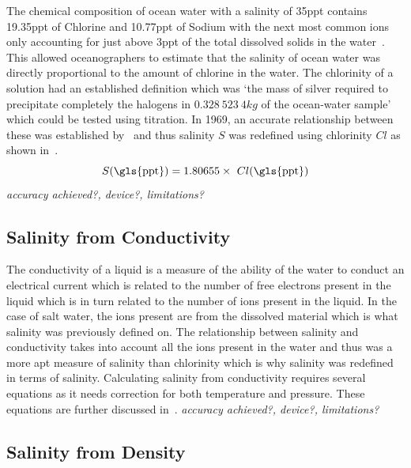 The chemical composition of ocean water with a salinity of 35\gls{ppt} contains 19.35\gls{ppt} of Chlorine and 10.77\gls{ppt} of Sodium with the next most common ions only accounting for just above 3\gls{ppt} of the total dissolved solids in the water~\cite{britannica_seawater_encyclopaedia_2024}.
This allowed oceanographers to estimate that the salinity of ocean water was directly proportional to the amount of chlorine in the water.
The chlorinity of a solution had an established definition which was `the mass of silver required to precipitate completely the halogens in $0.328\ 523\ 4 kg$ of the ocean-water sample'~\cite{wooster_redefinition_of_salinity_1969} which could be tested using titration.
In 1969, an accurate relationship between these was established by~ and thus salinity $S$ was redefined using chlorinity $Cl$ as shown in~.
\begin{equation}\label{eq:salinity-chlorinity}
    S (\text{\gls{ppt}}) = 1.80655 \times~Cl (\text{\gls{ppt}})
\end{equation}
\textit{accuracy achieved?, device?, limitations?}

\subsection{Salinity from Conductivity}\label{subsec:salinity-from-conductivity}

The conductivity of a liquid is a measure of the ability of the water to conduct an electrical current which is related to the number of free electrons present in the liquid which is in turn related to the number of ions present in the liquid.
In the case of salt water, the ions present are from the dissolved material which is what salinity was previously defined on.
The relationship between salinity and conductivity takes into account all the ions present in the water and thus was a more apt measure of salinity than chlorinity which is why salinity was redefined in terms of salinity.
Calculating salinity from conductivity requires several equations as it needs correction for both temperature and pressure. 
These equations are further discussed in~.
\textit{accuracy achieved?, device?, limitations?}

\subsection{Salinity from Density}

